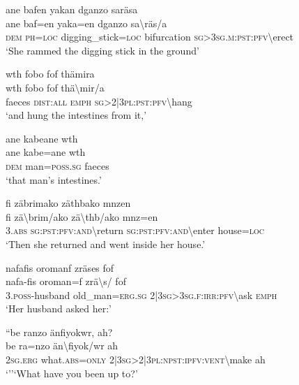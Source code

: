 \ea\label{ex:7:a4770}
ane bafen yakan dganzo saräsa\\
\gll ane	baf=en	yaka=en	dganzo	sa{\textbackslash}räs/a\\
     \textsc{dem}	\textsc{ph}=\textsc{loc}	digging\_stick=\textsc{loc}	bifurcation	\textsc{sg}>3\textsc{sg}.\textsc{m}:\textsc{pst}:\textsc{pfv}{\textbackslash}erect\\
\glt `She rammed the digging stick in the ground'
\z

\ea\label{ex:7:a4772}
wth fobo fof thämira\\
\gll wth	fobo	fof	thä{\textbackslash}mir/a\\
     faeces	\textsc{dist}:\textsc{all}	\textsc{emph}	\textsc{sg}>2|3\textsc{pl}:\textsc{pst}:\textsc{pfv}{\textbackslash}hang\\
\glt `and hung the intestines from it,'
\z

\ea\label{ex:7:a4773}
ane kabeane wth\\
\gll ane	kabe=ane	wth\\
     \textsc{dem}	man=\textsc{poss}.\textsc{sg}	faeces\\
\glt `that man's intestines.'
\z

\ea\label{ex:7:a4774}
fi zäbrimako zäthbako mnzen\\
\gll fi	zä{\textbackslash}brim/ako	zä{\textbackslash}thb/ako	mnz=en\\
     3.\textsc{abs}	\textsc{sg}:\textsc{pst}:\textsc{pfv}:\textsc{and}{\textbackslash}return	\textsc{sg}:\textsc{pst}:\textsc{pfv}:\textsc{and}{\textbackslash}enter	house=\textsc{loc}\\
\glt `Then she returned and went inside her house.'
\z

\ea\label{ex:7:a4776}
nafafis oromanf zräses fof\\
\gll nafa-fis	oroman=f	zrä{\textbackslash}s/	fof\\
     3.\textsc{poss}-husband	old\_man=\textsc{erg}.\textsc{sg}	2|3\textsc{sg}>3\textsc{sg}.\textsc{f}:\textsc{irr}:\textsc{pfv}{\textbackslash}ask	\textsc{emph}\\
\glt `Her husband asked her:'
\z

\ea\label{ex:7:a4777}
``be ranzo änfiyokwr, ah?\\
\gll be	ra=nzo	än{\textbackslash}fiyok/wr	ah\\
     2\textsc{sg}.\textsc{erg}	what.\textsc{abs}=\textsc{only}	2|3\textsc{sg}>2|3\textsc{pl}:\textsc{npst}:\textsc{ipfv}:\textsc{vent}{\textbackslash}make	ah\\
\glt `''‘What have you been up to?'
\z

